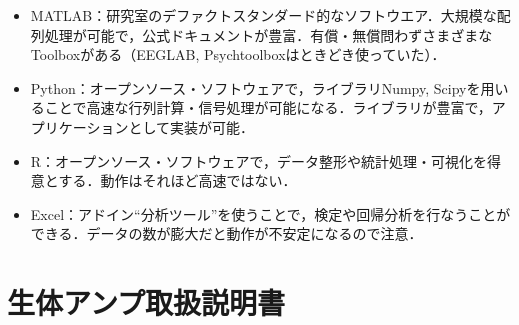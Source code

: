 \documentclass[a4j, twocolumn, openleft, uplatex, dvipdfmx]{jsbook}
\begin{document}
            \begin{itemize}
                \item \textsf{MATLAB}：研究室のデファクトスタンダード的なソフトウエア．大規模な配列処理が可能で，公式ドキュメントが豊富．有償・無償問わずさまざまなToolboxがある（EEGLAB, Psychtoolboxはときどき使っていた）．
                \item \textsf{Python}：オープンソース・ソフトウェアで，ライブラリNumpy, Scipyを用いることで高速な行列計算・信号処理が可能になる．ライブラリが豊富で，アプリケーションとして実装が可能．
                \item \textsf{R}：オープンソース・ソフトウェアで，データ整形や統計処理・可視化を得意とする．動作はそれほど高速ではない．
                \item \textsf{Excel}：アドイン``分析ツール''を使うことで，検定や回帰分析を行なうことができる．データの数が膨大だと動作が不安定になるので注意．
            \end{itemize}

    \clearpage
    \appendix
    \chapter{生体アンプ取扱説明書}
    
\end{document}
